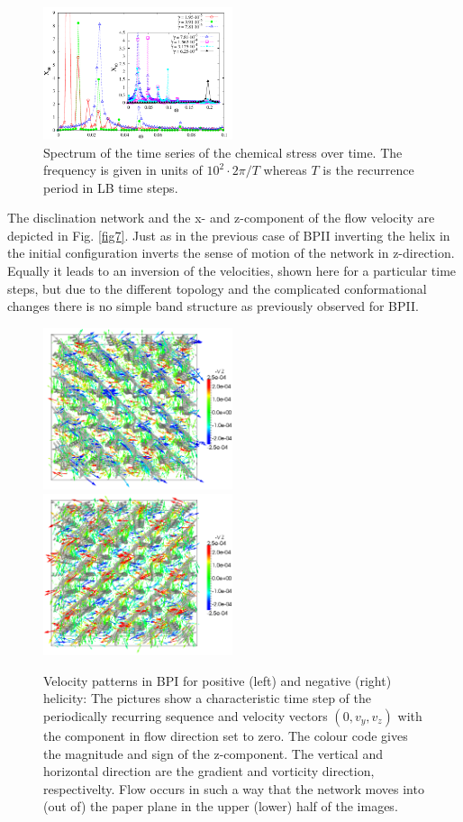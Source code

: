 \documentclass[aps,pre,reprint,superscriptaddress]{revtex4}
\begin{document}
\begin{figure}[h]
\includegraphics[width=0.495\textwidth]{spectrum_bp1.pdf}
\caption{Spectrum of the time series of the chemical stress over time. The frequency is given in units of $10^2\cdot 2\pi/T$ whereas $T$ is the recurrence period in LB time steps.}
\label{bp1-spec}
\end{figure}

The disclination network and the x- and z-component of the flow velocity are depicted in Fig. \ref{fig7}.
Just as in the previous case of BPII inverting the helix in the initial configuration inverts the sense of motion of the network in z-direction.
Equally it leads to an inversion of the velocities, shown here for a particular time steps, but due to the different topology and the complicated conformational changes there is no simple band structure as previously observed for BPII. 

\begin{figure}[h]
\includegraphics[width=0.495\textwidth]{v_yz-v_z-360k_run914.png}
\includegraphics[width=0.495\textwidth]{v_yz-v_z-360k_run922.png}
\caption{Velocity patterns in BPI for positive (left) and negative (right) helicity: The pictures show a characteristic time step of the periodically recurring sequence and velocity vectors $(0,v_y,v_z)$ with the component in flow direction set to zero. The colour code gives the magnitude and sign of the z-component. The vertical and horizontal direction are the gradient and vorticity direction, respectivelty. Flow occurs in such a way that the network moves into (out of) the paper plane in the upper (lower) half of the images.}
\label{bp1-velo}
\end{figure}
\end{document}
